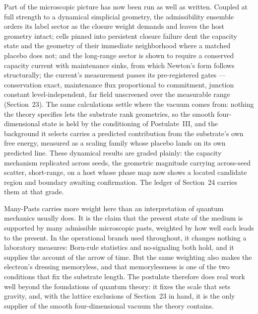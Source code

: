 \documentclass[11pt]{article}
\begin{document}
Part of the microscopic picture has now been run as well as written. Coupled at full strength to a dynamical simplicial geometry, the admissibility ensemble orders its label sector as the closure weight demands and leaves the host geometry intact; cells pinned into persistent closure failure dent the capacity state and the geometry of their immediate neighborhood where a matched placebo does not; and the long-range sector is shown to require a conserved capacity current with maintenance sinks, from which Newton's form follows structurally; the current's measurement passes its pre-registered gates --- conservation exact, maintenance flux proportional to commitment, junction constant level-independent, far field unscreened over the measurable range (Section~23). The same calculations settle where the vacuum comes from: nothing the theory specifies lets the substrate rank geometries, so the smooth four-dimensional state is held by the conditioning of Postulate~III, and the background it selects carries a predicted contribution from the substrate's own free energy, measured as a scaling family whose placebo lands on its own predicted line. These dynamical results are graded plainly: the capacity mechanism replicated across seeds, the geometric magnitude carrying across-seed scatter, short-range, on a host whose phase map now shows a located candidate region and boundary awaiting confirmation. The ledger of Section~24 carries them at that grade.

Many-Pasts carries more weight here than an interpretation of quantum mechanics usually does. It is the claim that the present state of the medium is supported by many admissible microscopic pasts, weighted by how well each leads to the present. In the operational branch used throughout, it changes nothing a laboratory measures: Born-rule statistics and no-signaling both hold, and it supplies the account of the arrow of time. But the same weighting also makes the electron's dressing memoryless, and that memorylessness is one of the two conditions that fix the substrate length. The postulate therefore does real work well beyond the foundations of quantum theory: it fixes the scale that sets gravity, and, with the lattice exclusions of Section~23 in hand, it is the only supplier of the smooth four-dimensional vacuum the theory contains.
\end{document}
